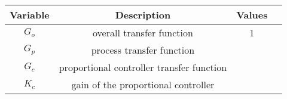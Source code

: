 \begin{tabular}{|c|c|c|c}
    \hline
    \textbf{Variable} & \textbf{Description} & \textbf{Values}\\
    \hline
    $G_o$ & overall transfer function & 1\\
    \hline
    $G_p$ & process transfer function & \\
    \hline
    $G_c$ & proportional controller transfer function & \\
    \hline
    $K_c$ & gain of the proportional controller & \\
    \hline
\end{tabular}
